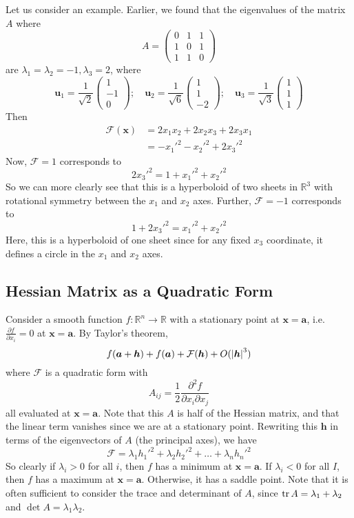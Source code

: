 \documentclass{article}
\begin{document}
Let us consider an example. Earlier, we found that the eigenvalues of the matrix $A$ where
\[ A = \begin{pmatrix}
		0 & 1 & 1 \\ 1 & 0 & 1 \\ 1 & 1 & 0
	\end{pmatrix} \]
are $\lambda_1 = \lambda_2 = -1, \lambda_3 = 2$, where
\[ \bm u_1 = \frac{1}{\sqrt 2} \begin{pmatrix}
		1 \\ -1 \\ 0
	\end{pmatrix};\quad \bm u_2 = \frac{1}{\sqrt 6}\begin{pmatrix}
		1 \\ 1 \\ -2
	\end{pmatrix};\quad \bm u_3 = \frac{1}{\sqrt 3}\begin{pmatrix}
		1 \\ 1 \\ 1
	\end{pmatrix} \]
Then
\begin{align*}
	\mathcal F(\bm x) & = 2x_1x_2 + 2x_2x_3 + 2x_3x_1 \\
	                  & = -x_1'^2 -x_2'^2 + 2x_3'^2
\end{align*}
Now, $\mathcal F = 1$ corresponds to
\[ 2x_3'^2 = 1 + x_1'^2 + x_2'^2 \]
So we can more clearly see that this is a hyperboloid of two sheets in $\mathbb R^3$ with rotational symmetry between the $x_1$ and $x_2$ axes. Further, $\mathcal F = -1$ corresponds to
\[ 1 + 2x_3'^2 = x_1'^2 + x_2'^2 \]
Here, this is a hyperboloid of one sheet since for any fixed $x_3$ coordinate, it defines a circle in the $x_1$ and $x_2$ axes.

\subsection{Hessian Matrix as a Quadratic Form}
Consider a smooth function $f\colon \mathbb R^n \to \mathbb R$ with a stationary point at $\bm x = \bm a$, i.e. $\frac{\partial f}{\partial x_i} = 0$ at $\bm x = \bm a$. By Taylor's theorem,
\[ f(\bm a + \bm h) + f(\bm a) + \mathcal F(\bm h) + O(\abs{\bm h}^3) \]
where $\mathcal F$ is a quadratic form with
\[ A_{ij} = \frac{1}{2}\frac{\partial^2 f}{\partial x_i\partial x_j} \]
all evaluated at $\bm x = \bm a$. Note that this $A$ is half of the Hessian matrix, and that the linear term vanishes since we are at a stationary point. Rewriting this $\bm h$ in terms of the eigenvectors of $A$ (the principal axes), we have
\[ \mathcal F = \lambda_1 h_1'^2 + \lambda_2 h_2'^2 + \dots + \lambda_n h_n'^2 \]
So clearly if $\lambda_i > 0$ for all $i$, then $f$ has a minimum at $\bm x = \bm a$. If $\lambda_i < 0$ for all $I$, then $f$ has a maximum at $\bm x = \bm a$. Otherwise, it has a saddle point. Note that it is often sufficient to consider the trace and determinant of $A$, since $\trace A = \lambda_1 + \lambda_2$ and $\det A = \lambda_1\lambda_2$.
\end{document}
